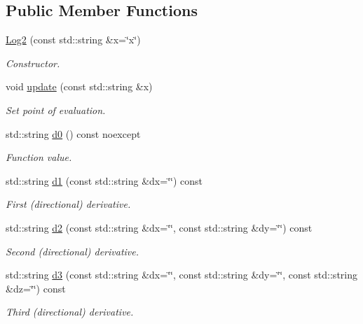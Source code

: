\subsection*{Public Member Functions}
\begin{DoxyCompactItemize}
\item 
\hyperlink{structFunG_1_1texify_1_1Log2_a5caf39289b9b2df44ab158fe662992b9}{Log2} (const std\-::string \&x=\char`\"{}x\char`\"{})
\begin{DoxyCompactList}\small\item\em Constructor. \end{DoxyCompactList}\item 
void \hyperlink{structFunG_1_1texify_1_1Log2_aa75af872b1a7b0bdaf690297cc2d25de}{update} (const std\-::string \&x)
\begin{DoxyCompactList}\small\item\em Set point of evaluation. \end{DoxyCompactList}\item 
std\-::string \hyperlink{structFunG_1_1texify_1_1Log2_a577fe8797da89bf013cb9a9cb3b9af18}{d0} () const noexcept
\begin{DoxyCompactList}\small\item\em Function value. \end{DoxyCompactList}\item 
std\-::string \hyperlink{structFunG_1_1texify_1_1Log2_a443076997a4d565dbc4ef204131cdf8c}{d1} (const std\-::string \&dx=\char`\"{}\char`\"{}) const 
\begin{DoxyCompactList}\small\item\em First (directional) derivative. \end{DoxyCompactList}\item 
std\-::string \hyperlink{structFunG_1_1texify_1_1Log2_a55e9b2a9b3652896a1767d64304bf427}{d2} (const std\-::string \&dx=\char`\"{}\char`\"{}, const std\-::string \&dy=\char`\"{}\char`\"{}) const 
\begin{DoxyCompactList}\small\item\em Second (directional) derivative. \end{DoxyCompactList}\item 
std\-::string \hyperlink{structFunG_1_1texify_1_1Log2_ab8af458113dd07486e29f7f32287dfa4}{d3} (const std\-::string \&dx=\char`\"{}\char`\"{}, const std\-::string \&dy=\char`\"{}\char`\"{}, const std\-::string \&dz=\char`\"{}\char`\"{}) const 
\begin{DoxyCompactList}\small\item\em Third (directional) derivative. \end{DoxyCompactList}\end{DoxyCompactItemize}


